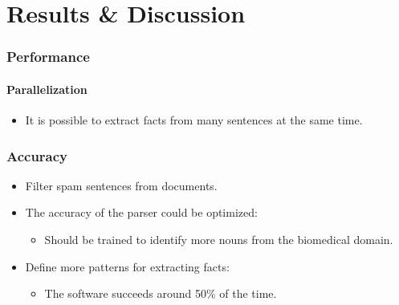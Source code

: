 \documentclass[mathserif]{beamer}
\begin{document}
\section{Results \& Discussion}

\begin{frame}

\frametitle{Performance}
\framesubtitle{Parallelization}

\begin{itemize}[<+->]

\item It is possible to extract facts from many sentences at the same time.

\end{itemize}

\end{frame}

\begin{frame}

\frametitle{Accuracy}

\begin{itemize}[<+->]

\item Filter spam sentences from documents.

\item The accuracy of the parser could be optimized:
\begin{itemize}[<+->]

\item Should be trained to identify more nouns from the biomedical
domain.

\end{itemize}

\item Define more patterns for extracting facts:
\begin{itemize}[<+->]

\item The software succeeds around 50\% of the time.

\end{itemize}

\end{itemize}

\end{frame}
\end{document}
